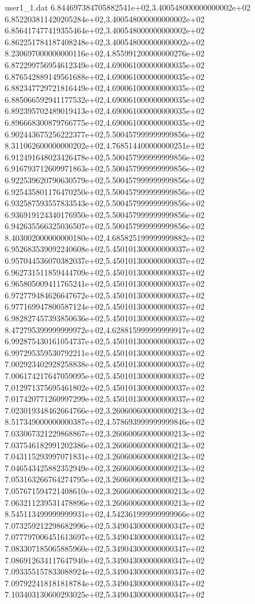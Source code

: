 \begin{filecontents}{user1_1.dat}
6.844697384705882541e+02,3.400548000000000002e+02
6.852203811420205284e+02,3.400548000000000002e+02
6.856417477419355464e+02,3.400548000000000002e+02
6.862251784187408248e+02,3.400548000000000002e+02
8.230697000000000116e+02,4.855991200000000276e+02
6.872299756954612349e+02,4.690061000000000035e+02
6.876542889149561688e+02,4.690061000000000035e+02
6.882347729721816449e+02,4.690061000000000035e+02
6.885066592941177532e+02,4.690061000000000035e+02
6.892395702489019413e+02,4.690061000000000035e+02
6.896668300879766775e+02,4.690061000000000035e+02
6.902443675256222377e+02,5.500457999999999856e+02
8.311062600000000202e+02,4.768514400000000251e+02
6.912491648023426478e+02,5.500457999999999856e+02
6.916793712609971863e+02,5.500457999999999856e+02
6.922539620790630579e+02,5.500457999999999856e+02
6.925435801176470250e+02,5.500457999999999856e+02
6.932587593557833543e+02,5.500457999999999856e+02
6.936919124340176950e+02,5.500457999999999856e+02
6.942635566325036507e+02,5.500457999999999856e+02
8.403002000000000180e+02,4.685825199999999882e+02
6.952683539092240608e+02,5.450101300000000037e+02
6.957044536070382037e+02,5.450101300000000037e+02
6.962731511859444709e+02,5.450101300000000037e+02
6.965805009411765241e+02,5.450101300000000037e+02
6.972779484626647672e+02,5.450101300000000037e+02
6.977169947800587124e+02,5.450101300000000037e+02
6.982827457393850636e+02,5.450101300000000037e+02
8.472795399999999972e+02,4.628815999999999917e+02
6.992875430161054737e+02,5.450101300000000037e+02
6.997295359530792211e+02,5.450101300000000037e+02
7.002923402928258838e+02,5.450101300000000037e+02
7.006174217647059095e+02,5.450101300000000037e+02
7.012971375695461802e+02,5.450101300000000037e+02
7.017420771260997299e+02,5.450101300000000037e+02
7.023019348462664766e+02,3.260600600000000213e+02
8.517349000000000387e+02,4.578693999999999846e+02
7.033067321229868867e+02,3.260600600000000213e+02
7.037546182991202386e+02,3.260600600000000213e+02
7.043115293997071831e+02,3.260600600000000213e+02
7.046543425882352949e+02,3.260600600000000213e+02
7.053163266764274795e+02,3.260600600000000213e+02
7.057671594721408610e+02,3.260600600000000213e+02
7.063211239531478896e+02,3.260600600000000213e+02
8.545113499999999931e+02,4.542361999999999966e+02
7.073259212298682996e+02,5.349043000000000347e+02
7.077797006451613697e+02,5.349043000000000347e+02
7.083307185065885960e+02,5.349043000000000347e+02
7.086912634117647940e+02,5.349043000000000347e+02
7.093355157833088924e+02,5.349043000000000347e+02
7.097922418181818784e+02,5.349043000000000347e+02
7.103403130600293025e+02,5.349043000000000347e+02

\end{filecontents}

